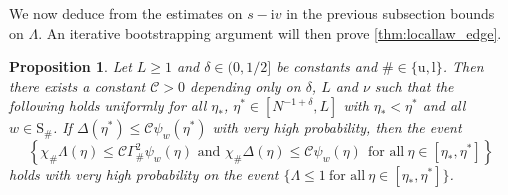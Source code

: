 \documentclass[10pt,a4paper]{amsart}
\newcommand{\ii}{\mathrm{i}}
\newtheorem{prop}{Proposition}[section]
\numberwithin{equation}{section}
\begin{document}
	We now deduce from the estimates on $s-\ii v$ in the previous subsection bounds on $\Lambda$. 
	An iterative bootstrapping argument will then prove \cref{thm:locallaw_edge}. 

	\begin{prop}\label{prop:phi_Lambda_small2}
		Let $L \geq 1$ and $\delta \in (0,1/2]$ be constants and $\# \in \{\mathrm{u},\mathrm{l}\}$. Then there exists a constant $\mathcal C >0$ depending only on $\delta$, $L$ and $\nu$ such that the following holds uniformly for all $\eta_*$, $\eta^* \in [N^{-1+\delta},L]$ with $\eta_* < \eta^*$ and all $w \in \mathrm{S}_\#$. If $\Delta(\eta^*) \leq \mathcal C  \psi_w(\eta^*)$ with very high probability, then the event 
		\begin{equation*}
			\left\{ \chi_\# \Lambda (\eta)\le \mathcal{C}\Gamma_\#^2 \psi_w(\eta) \text{ and } \chi_\# \Delta(\eta) \leq \mathcal C \psi_w(\eta) ~~\text{for all}~ \eta \in [ \eta_{\ast}, \eta^{\ast}] \right\}
		\end{equation*}
		holds with very high probability on the event $\{ \Lambda \leq 1 ~\text{for all} ~ \eta \in [\eta_{\ast}, \eta^{\ast}]\}$. 
	\end{prop}
\end{document}
